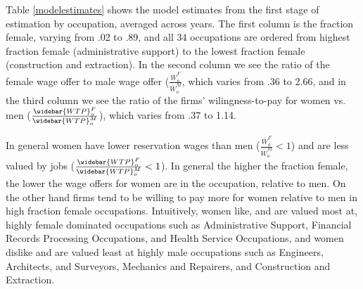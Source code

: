 \documentclass[12pt]{article}
\begin{document}

Table \ref{modelestimates} shows the model estimates from the first stage of estimation by occupation, averaged across years. The first column is the fraction female, varying from .02 to .89, and all 34 occupations are ordered from highest fraction female (administrative support) to the lowest fraction female (construction and extraction). In the second column we see the ratio of the female wage offer to male wage offer ($  \frac{\bar{W}^F_o}{\bar{W}^M_o}$, which varies from .36 to 2.66, and in the third column we see the ratio of the firms' wilingness-to-pay for women vs. men ($ \frac{\widebar{WTP}^F_o}{\widebar{WTP}^M_o}$), which varies from .37 to 1.14. 



In general women have lower reservation wages than men ($  \frac{\bar{W}^F_o}{\bar{W}^M_o} < 1$) and are less valued by jobs ($ \frac{\widebar{WTP}^F_o}{\widebar{WTP}^M_o} < 1$). In general the higher the fraction female, the lower the wage offers for women are in the occupation, relative to men. On the other hand firms tend to be willing to pay more for women relative to men in high fraction female occupations. Intuitively, women like, and are valued most at, highly female dominated occupations such as Administrative Support, Financial Records Processing Occupations, and Health Service Occupations, and women dislike and are valued least at highly male occupations such as Engineers, Architects, and Surveyors, Mechanics and Repairers, and Construction and Extraction.


\end{document}
